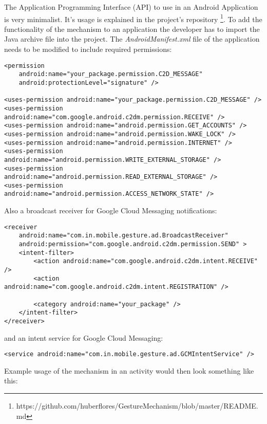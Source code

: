 The Application Programming Interface (API) to use in an Android Application is very minimalist. It's usage is explained in the project's repository \footnote{https://github.com/huberflores/GestureMechanism/blob/master/README.md}. To add the functionality of the mechanism to an application the developer has to import the Java archive file into the project. The \textit{AndroidManifest.xml} file of the application needs to be modified to include required permissions:

\lstset{language=XML}
\begin{lstlisting}
<permission
    android:name="your_package.permission.C2D_MESSAGE"
    android:protectionLevel="signature" />

<uses-permission android:name="your_package.permission.C2D_MESSAGE" />
<uses-permission android:name="com.google.android.c2dm.permission.RECEIVE" />
<uses-permission android:name="android.permission.GET_ACCOUNTS" />
<uses-permission android:name="android.permission.WAKE_LOCK" />
<uses-permission android:name="android.permission.INTERNET" />
<uses-permission android:name="android.permission.WRITE_EXTERNAL_STORAGE" />
<uses-permission android:name="android.permission.READ_EXTERNAL_STORAGE" />
<uses-permission android:name="android.permission.ACCESS_NETWORK_STATE" />
\end{lstlisting}

Also a broadcast receiver for Google Cloud Messaging notifications:

\begin{lstlisting}
<receiver
    android:name="com.in.mobile.gesture.ad.BroadcastReceiver"
    android:permission="com.google.android.c2dm.permission.SEND" >
    <intent-filter>
        <action android:name="com.google.android.c2dm.intent.RECEIVE" />
        <action android:name="com.google.android.c2dm.intent.REGISTRATION" />

        <category android:name="your_package" />
    </intent-filter>
</receiver>
\end{lstlisting}

and an intent service for Google Cloud Messaging:

\begin{lstlisting}
<service android:name="com.in.mobile.gesture.ad.GCMIntentService" />
\end{lstlisting}

Example usage of the mechanism in an activity would then look something like this:

\lstset{language=Java}


